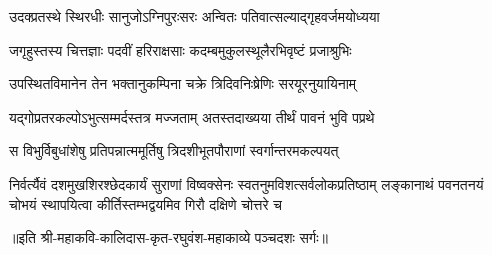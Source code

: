 \twolineshloka
{उदक्प्रतस्थे स्थिरधीः सानुजोऽग्निपुरःसरः}
{अन्वितः पतिवात्सल्याद्गृहवर्जमयोध्यया} %

\twolineshloka
{जगृहुस्तस्य चित्तज्ञाः पदवीं हरिराक्षसाः}
{कदम्बमुकुलस्थूलैरभिवृष्टं प्रजाश्रुभिः} %

\twolineshloka
{उपस्थितविमानेन तेन भक्तानुकम्पिना}
{चक्रे त्रिदिवनिःष्रेणिः सरयूरनुयायिनाम्} %

\twolineshloka
{यद्गोप्रतरकल्पोऽभुत्सम्मर्दस्तत्र मज्जताम्}
{अतस्तदाख्यया तीर्थं पावनं भुवि पप्रथे} %

\twolineshloka
{स विभुर्विबुधांशेषु प्रतिपन्नात्ममूर्तिषु}
{त्रिदशीभूतपौराणां स्वर्गान्तरमकल्पयत्} %

\fourlineindentedshloka
{निर्वर्त्यैवं दशमुखशिरश्छेदकार्यं सुराणां}
{विष्वक्सेनः स्वतनुमविशत्सर्वलोकप्रतिष्ठाम्}
{लङ्कानाथं पवनतनयं चोभयं स्थापयित्वा}
{कीर्तिस्तम्भद्वयमिव गिरौ दक्षिणे चोत्तरे च} %

॥इति श्री-महाकवि-कालिदास-कृत-रघुवंश-महाकाव्ये पञ्चदशः सर्गः॥

